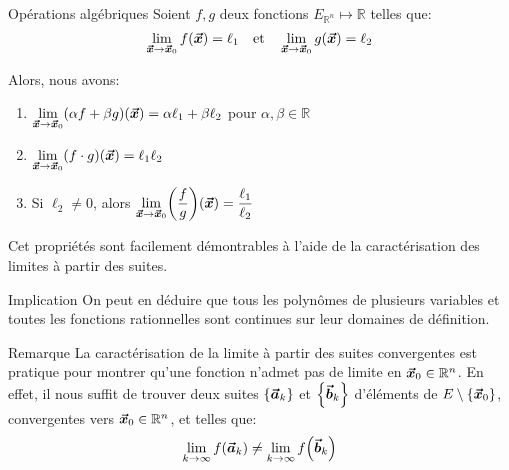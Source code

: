\documentclass[a4paper]{article}
\begin{document}
\begin{parag}{Opérations algébriques}
    Soient $f,g$ deux fonctions $E_{\mathbb{R}^n} \mapsto \mathbb{R}$ telles que: 
    \[\lim_{\bvec{x} \to \bvec{x}_0} f\left(\bvec{x}\right) = \ell_1 \mathspace \text{et} \mathspace \lim_{\bvec{x} \to \bvec{x}_0} g\left(\bvec{x}\right) = \ell_2\]

    Alors, nous avons:
    \begin{enumerate}
        \item $\displaystyle \lim_{\bvec{x} \to \bvec{x}_0} \left(\alpha f + \beta g\right)\left(\bvec{x}\right) = \alpha \ell_1 + \beta \ell_2$ pour $\alpha, \beta \in \mathbb{R}$
        \item $\displaystyle \lim_{\bvec{x} \to \bvec{x}_0} \left(f\cdot g\right)\left(\bvec{x}\right) = \ell_1 \ell_2$
        \item Si $\ell_2 \neq 0$, alors $\displaystyle \lim_{\bvec{x} \to \bvec{x}_0} \left(\frac{f}{g}\right)\left(\bvec{x}\right) = \frac{\ell_1}{\ell_2}$
    \end{enumerate}
    
    Cet propriétés sont facilement démontrables à l'aide de la caractérisation des limites à partir des suites.

    \begin{subparag}{Implication}
        On peut en déduire que tous les polynômes de plusieurs variables et toutes les fonctions rationnelles sont continues sur leur domaines de définition.
    \end{subparag}
\end{parag}

\begin{parag}{Remarque}
    La caractérisation de la limite à partir des suites convergentes est pratique pour montrer qu'une fonction n'admet pas de limite en $\bm{\protect\vec{x}}_0 \in \mathbb{R}^n$. En effet, il nous suffit de trouver deux suites $\left\{\bvec{a}_k\right\}$ et $\left\{\bvec{b}_k\right\}$ d'éléments de $E \setminus \left\{\bvec{x}_0\right\}$, convergentes vers $\bm{\protect\vec{x}}_0 \in \mathbb{R}^n$, et telles que:
    \[\lim_{k \to \infty} f\left(\bvec{a}_k\right) \neq \lim_{k \to \infty}  f\left(\bvec{b}_k\right)\]
\end{parag}
\end{document}
